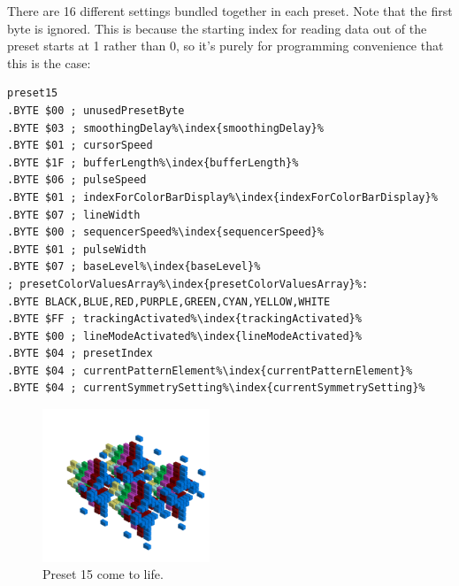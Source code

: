 There are 16 different settings bundled together in each preset. Note that the first byte is ignored. This is because
the starting index for reading data out of the preset starts at 1 rather than 0, so it's purely for programming
convenience that this is the case:
\begin{lstlisting}[basicstyle=\ttfamily\scriptsize,escapechar=\%]
preset15
.BYTE $00 ; unusedPresetByte
.BYTE $03 ; smoothingDelay%\index{smoothingDelay}%
.BYTE $01 ; cursorSpeed
.BYTE $1F ; bufferLength%\index{bufferLength}%
.BYTE $06 ; pulseSpeed
.BYTE $01 ; indexForColorBarDisplay%\index{indexForColorBarDisplay}%
.BYTE $07 ; lineWidth
.BYTE $00 ; sequencerSpeed%\index{sequencerSpeed}%
.BYTE $01 ; pulseWidth
.BYTE $07 ; baseLevel%\index{baseLevel}%
; presetColorValuesArray%\index{presetColorValuesArray}%: 
.BYTE BLACK,BLUE,RED,PURPLE,GREEN,CYAN,YELLOW,WHITE
.BYTE $FF ; trackingActivated%\index{trackingActivated}%
.BYTE $00 ; lineModeActivated%\index{lineModeActivated}%
.BYTE $04 ; presetIndex
.BYTE $04 ; currentPatternElement%\index{currentPatternElement}%
.BYTE $04 ; currentSymmetrySetting%\index{currentSymmetrySetting}%
\end{lstlisting}
\vfill
\begin{figure}[H]                                                          
  \centering                                                             
  \begin{adjustbox}{width=6cm,center}                                   
  \includegraphics[width=5cm]{src/presets/pattern15-45.png}%
  \end{adjustbox}                                                        
\caption{Preset 15 come to life.}                                           
\end{figure}                                                               

